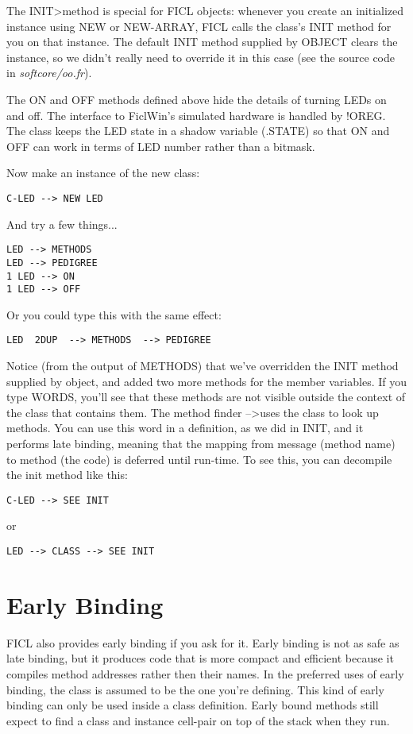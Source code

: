 \begin{;stlisting}[frame=single]
The INIT\textgreater  method is special for FICL objects: whenever you
create an initialized instance using NEW or NEW-ARRAY, FICL calls the
class's INIT method for you on that instance. The default INIT method
supplied by OBJECT clears the instance, so we didn't really need to
override it in this case (see the source code in
\textit{softcore/oo.fr}).

The ON and OFF methods defined above hide the details of turning LEDs
on and off. The interface to FiclWin's simulated hardware is handled by
!OREG. The class keeps the LED state in a shadow variable (.STATE) so
that ON and OFF can work in terms of LED number rather than a bitmask.

Now make an instance of the new class:
\begin{lstlisting}[frame=single]
C-LED --> NEW LED
\end{lstlisting}
And try a few things...
\begin{lstlisting}[frame=single]
LED --> METHODS
LED --> PEDIGREE
1 LED --> ON
1 LED --> OFF
\end{lstlisting}
Or you could type this with the same effect:
\begin{lstlisting}[frame=single]
LED  2DUP  --> METHODS  --> PEDIGREE
\end{lstlisting}
Notice (from the output of METHODS) that we've overridden the INIT
method supplied by object, and added two more methods for the member
variables. If you type WORDS, you'll see that these methods are not
visible outside the context of the class that contains them. The method
finder --\textgreater uses the class to look up methods. You can use
this word in a definition, as we did in INIT, and it performs late
binding, meaning that the mapping from message (method name) to method
(the code) is deferred until run-time. To see this, you can decompile
the init method like this:
\begin{lstlisting}[frame=single]
C-LED --> SEE INIT
\end{lstlisting}
or
\begin{lstlisting}[frame=single]
LED --> CLASS --> SEE INIT
\end{lstlisting}


\section{Early Binding}
FICL also provides early binding if you ask for it. Early binding is not
as safe as late binding, but it produces code that is more compact and
efficient because it compiles method addresses rather then their names.
In the preferred uses of early binding, the class is assumed to be the
one you're defining. This kind of early binding can only be used inside
a class definition. Early bound methods still expect to find a class
and instance cell-pair on top of the stack when they run.


\end{;stlisting}
